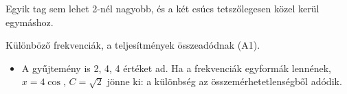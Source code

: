 Egyik tag sem lehet 2-nél nagyobb, és a két csúcs tetszőlegesen közel kerül egymáshoz.

\begin{center}\end{center}

Különböző frekvenciák, a teljesítmények összeadódnak (A1).

\begin{center}\end{center}



\begin{center}\end{center}
\begin{eredmeny}

\begin{center}\end{center}
\end{eredmeny}
\begin{tipp}[Ellenőrzés]
\begin{itemize}
\item A gyűjtemény is 2, 4, 4 értéket ad. Ha a frekvenciák egyformák lennének, $x=4\cos$, $C=\sqrt2$ jönne ki: a különbség az összemérhetetlenségből adódik.
\end{itemize}
\end{tipp}


